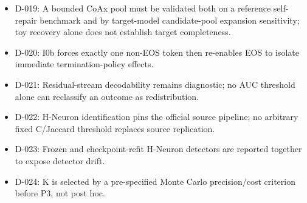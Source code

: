 \begin{itemize}
\item D-019: A bounded CoAx pool must be validated both on a reference self-repair benchmark and by target-model candidate-pool expansion sensitivity; toy recovery alone does not establish target completeness.
\item D-020: I0b forces exactly one non-EOS token then re-enables EOS to isolate immediate termination-policy effects.
\item D-021: Residual-stream decodability remains diagnostic; no AUC threshold alone can reclassify an outcome as redistribution.
\item D-022: H-Neuron identification pins the official source pipeline; no arbitrary fixed C/Jaccard threshold replaces source replication.
\item D-023: Frozen and checkpoint-refit H-Neuron detectors are reported together to expose detector drift.
\item D-024: K is selected by a pre-specified Monte Carlo precision/cost criterion before P3, not post hoc.
\end{itemize}
